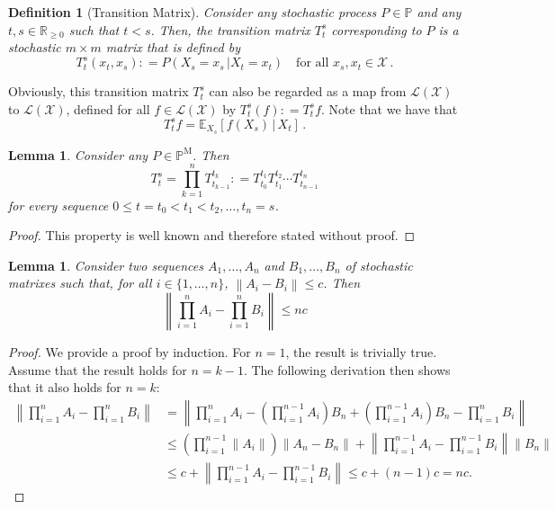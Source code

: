 \documentclass[10pt]{paper}
\newtheorem{lemma}[theorem]{Lemma}
\newtheorem{definition}{Definition}
\newcommand{\reals}{\mathbb{R}}
\newcommand{\realsnonneg}{\reals_{\geq 0}}
\newcommand{\states}{\mathcal{X}}
\newcommand{\processes}{\mathbb{P}}
\newcommand{\mprocesses}{\processes^{\mathrm{M}}}
\newcommand{\gambles}{\mathcal{L}}
\newcommand{\gamblesX}{\gambles(\states)}
\newcommand{\norm}[1]{\left\lVert #1 \right\rVert}
\newcommand{\coloneqq}{:\!=}
\begin{document}
\begin{definition}[Transition Matrix]\label{def:trans_matrix}
Consider any stochastic process $P\in\processes$ and any $t,s\in\realsnonneg$ such that $t<s$. Then, the \emph{transition matrix} $T_t^s$ \emph{corresponding to} $P$ is a stochastic $m\times m$ matrix that is defined by
\begin{equation*}
T_t^s(x_t, x_s) \coloneqq P(X_s=x_s\,\vert X_t=x_t)\quad\text{for all $x_s,x_t\in\states$}\,.
\end{equation*}
\end{definition}
Obviously, this transition matrix $T_t^s$ can also be regarded as a map from $\gamblesX$ to $\gamblesX$, defined for all $f\in\gamblesX$ by $T_t^s(f)\coloneqq T_t^sf$. Note that we have that
\begin{equation*}
T_t^sf = \mathbb{E}_{X_s}\left[f(X_s)\,\vert\,X_t\right]\,.
\end{equation*}


\begin{lemma}\label{lemma:transitionmatrixfactorises}
Consider any $P\in\mprocesses$. Then
\begin{equation*}
T_t^s=\prod_{k=1}^n T_{t_{k-1}}^{t_k} \coloneqq T_{t_0}^{t_1}T_{t_1}^{t_2}\cdots T_{t_{n-1}}^{t_n}
\end{equation*}
for every sequence $0\leq t=t_0<t_1<t_2,\dots,t_{n}=s$.
\end{lemma}
\begin{proof}
This property is well known and therefore stated without proof.
\end{proof}

\begin{lemma}\label{lemma:differenceproductoftransition}
Consider two sequences $A_1,\dots,A_n$ and $B_1,\dots,B_n$ of stochastic matrixes such that, for all $i\in\{1,\dots,n\}$, $\norm{A_i-B_i}\leq c$. Then
\begin{equation*}
\norm{\prod_{i=1}^nA_i-\prod_{i=1}^nB_i}\leq nc
\end{equation*}
\end{lemma}
\begin{proof}
We provide a proof by induction. For $n=1$, the result is trivially true. Assume that the result holds for $n=k-1$. The following derivation then shows that it also holds for $n=k$: 
\begin{align*}
\norm{\prod_{i=1}^nA_i-\prod_{i=1}^nB_i}
&=
\norm{\prod_{i=1}^{n}A_i-\left(\prod_{i=1}^{n-1}A_i\right)B_n+\left(\prod_{i=1}^{n-1}A_i\right)B_n-\prod_{i=1}^{n}B_i}\\
&\leq
\left(\prod_{i=1}^{n-1}\norm{A_i}\right)\norm{A_n-B_n}+\norm{\prod_{i=1}^{n-1}A_i-\prod_{i=1}^{n-1}B_i}\norm{B_n}\\
&\leq c + \norm{\prod_{i=1}^{n-1}A_i-\prod_{i=1}^{n-1}B_i}\leq c+(n-1)c= nc.
\end{align*}
\end{proof}
\end{document}
